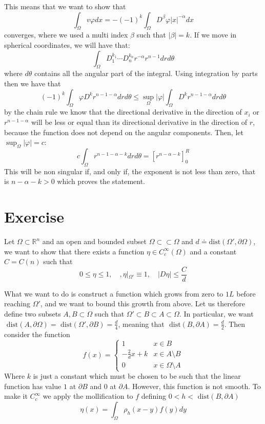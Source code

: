 \documentclass{article}
\newcommand{\R}{\mathbb{R}}
\newcommand{\dist}{\text{ dist}}
\begin{document}
This means that we want to show that
\[
    \int_\Omega v \varphi dx = - {(-1)}^k \int_\Omega D^\beta \varphi |x|^{-\alpha} dx
\]
converges, where we used a multi index $\beta$ such that $|\beta| = k$. If we move in spherical coordinates, we will have that:
\[
    \int_\Omega D^{k_1}_1 \cdots D^{k_n}_n r^{-\alpha} r^{n-1} dr d\theta
\]
where $d\theta$ contains all the angular part of the integral. Using integration by parts then we have that 
\[
    {(-1)}^k \int_\Omega \varphi D^k r^{n-1-\alpha} dr d\theta \leq \sup_{\Omega}|\varphi| \int_\Omega D^k r^{n-1-\alpha}drd\theta
\]
by the chain rule we know that the directional derivative in the direction of $x_i$ or $r^{n-1-\alpha}$ will be less or equal than its directional derivative in the direction of $r$, because the function does not depend on the angular components. Then, let $\sup_\Omega |\varphi|= c$:
\[
    c \int_\Omega r^{n-1-\alpha-k} dr d\theta = {\left[r^{n-\alpha- k} \right]}^R_0
\]
This will be non singular if, and only if, the exponent is not less than zero, that is $n-\alpha-k>0$ which proves the statement.

\section{Exercise}
Let $\Omega \subset \R^n$ and an open and bounded subset $\Omega \subset \subset \Omega$ and $d \doteq \text{dist}(\Omega', \partial \Omega)$, we want to show that there exists a function $\eta \in C^\infty _c (\Omega)$ and a constant $C = C(n)$ such that 
\[
    0\leq \eta \leq 1, \quad, \eta|_{\Omega'} \equiv 1, \quad |D\eta |\leq \frac{C}{d}
\]

What we want to do is construct a function which grows from zero to $1L $ before reaching $\Omega'$, and we want to bound this growth from above. Let us therefore define two subsets $A, B \subset \Omega$ such that $\Omega' \subset B \subset A \subset \Omega$. In particular, we want  $\dist(A, \partial \Omega) = \dist(\Omega', \partial B) = \frac{d}{4}$, meaning that $\dist(B, \partial A) = \frac{d}{2}$. Then consider the function
\[
    f(x) = \begin{cases}
        1 & x \in B\\
        -\frac{2}{d} x + k& x \in A\setminus B\\
        0 & x \in \Omega \setminus A
    \end{cases}    
\]
Where $k$ is just a constant which must be chosen to be such that the linear function has value $1$ at $\partial B$ and $0$ at $\partial A$. However, this function is not smooth. To make it $C^\infty_c$ we apply the mollification to $f$ defining $0 < h < \dist(B, \partial A)$
\[
    \eta(x) = \int_\Omega \rho_h (x-y) f(y) dy
\]   
\end{document}
